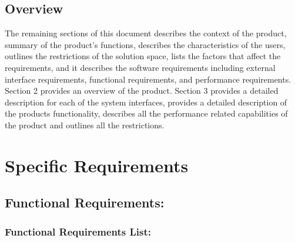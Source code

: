\documentclass[11pt]{article}
\begin{document}
	\subsection{Overview}
	The remaining sections of this document describes the context of the product, summary of the product’s functions, describes the characteristics of the users, outlines the restrictions of the solution space, lists the factors that affect the requirements, and it describes the software requirements including external interface requirements, functional requirements,  and performance requirements. Section 2 provides an overview of the product. Section 3 provides a detailed description for each of the system interfaces, provides a detailed description of the products functionality, describes all the performance related capabilities of the product and outlines all the restrictions. 

	\section{ Specific Requirements }
	
	\subsection{Functional Requirements:}
	
	\subsubsection{Functional Requirements List:}
	
\end{document}
